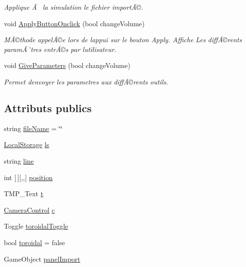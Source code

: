 \begin{DoxyCompactItemize}
\begin{DoxyCompactList}\small\item\em Applique Ã  la simulation le fichier importÃ©. \end{DoxyCompactList}\item 
void \mbox{\hyperlink{class_parameters_a8702daf046aa4d1c44a284c78f6ff058}{Apply\+Button\+Onclick}} (bool change\+Volume)
\begin{DoxyCompactList}\small\item\em MÃ©thode appelÃ©e lors de l\textquotesingle{}appui sur le bouton Apply. Affiche Les diffÃ©rents paramÃ¨tres entrÃ©s par l\textquotesingle{}utilisateur. \end{DoxyCompactList}\item 
void \mbox{\hyperlink{class_parameters_abc57bdbb6a4e2f78c7d71f1fa26b5fe8}{Give\+Parameters}} (bool change\+Volume)
\begin{DoxyCompactList}\small\item\em Permet d\textquotesingle{}envoyer les parametres aux diffÃ©rents outils. \end{DoxyCompactList}\end{DoxyCompactItemize}
\subsection*{Attributs publics}
\begin{DoxyCompactItemize}
\item 
string \mbox{\hyperlink{class_parameters_abbfa8fa8cae3b3c7db55b2c23ec747d5}{file\+Name}} = \char`\"{}\char`\"{}
\item 
\mbox{\hyperlink{class_local_storage}{Local\+Storage}} \mbox{\hyperlink{class_parameters_ab63c98cfc7508243010978c7c4d515a5}{ls}}
\item 
string \mbox{\hyperlink{class_parameters_a978bf381c1fd3f17e4289f182b7d647b}{line}}
\item 
int \mbox{[}$\,$\mbox{]}\mbox{[},,\mbox{]} \mbox{\hyperlink{class_parameters_ad01c1db17d90b97c666abf21a9c6fcd1}{position}}
\item 
T\+M\+P\+\_\+\+Text \mbox{\hyperlink{class_parameters_ab34fbc511ef46943e88471495d3b37c0}{t}}
\item 
\mbox{\hyperlink{class_camera_control}{Camera\+Control}} \mbox{\hyperlink{class_parameters_aac3a7af7ad68f30d87e89debcb137c1f}{c}}
\item 
Toggle \mbox{\hyperlink{class_parameters_a3cf74feb1b6bd8cc24bc3ef0e78e15fb}{toroidal\+Toggle}}
\item 
bool \mbox{\hyperlink{class_parameters_a8aec5ef7f7bdb0497b9de3ddce353c88}{toroidal}} = false
\item 
Game\+Object \mbox{\hyperlink{class_parameters_a9039782e9b57b1cca98f109c8bd22928}{panel\+Import}}
\end{DoxyCompactItemize}

